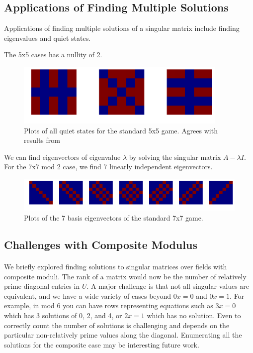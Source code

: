 \documentclass[11pt]{article}
\begin{document}
\subsection*{Applications of Finding Multiple Solutions}

Applications of finding multiple solutions of a singular matrix include finding eigenvalues and quiet states.


The 5x5 cases has a nullity of 2.

\begin{figure}
\caption{Plots of all quiet states for the standard 5x5 game.  Agrees with results from \cite{jaap}}
\label{quiet55}
\includegraphics[width=4in]{quiet55.png}
\end{figure}


We can find eigenvectors of eigenvalue $\lambda$ by solving the singular matrix $A - \lambda I$.  For the 7x7 mod 2 case, we find 7 linearly independent eigenvectors.

\begin{figure}
\caption{Plots of the 7 basis eigenvectors of the standard 7x7 game.}
\label{eigbasis77}
\includegraphics[width=\textwidth]{eigbasis77.png}
\end{figure}


\subsection*{Challenges with Composite Modulus}

\paragraph{} We briefly explored finding solutions to singular matrices over fields with composite moduli.  The rank of a matrix would now be the number of relatively prime diagonal entries in $U$.  A major challenge is that not all singular values are equivalent, and we have a wide variety of cases beyond $0x = 0$ and $0x =1$.  For example, in mod 6 you can have rows representing equations such as $3x = 0$ which has 3 solutions of 0, 2, and 4, or $2x = 1$ which has no solution.  Even to correctly count the number of solutions is challenging and depends on the particular non-relatively prime values along the diagonal.  Enumerating all the solutions for the composite case may be interesting future work.
\end{document}
